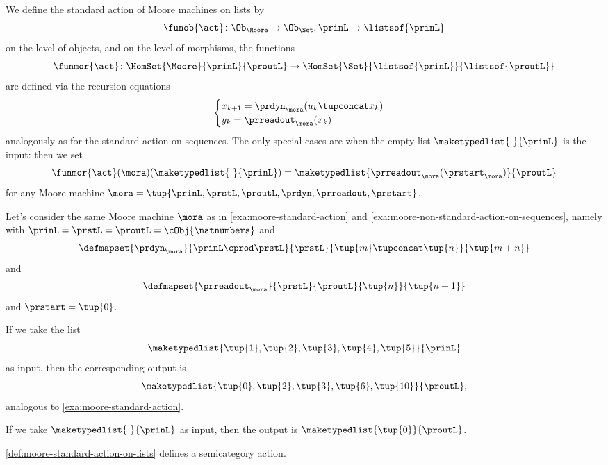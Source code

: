 \begin{definition}
\label{def:moore-standard-action-on-lists}
We define the standard action of Moore machines on lists by 
\begin{equation}
\funob{\act} \colon \Ob_{\Moore} \to \Ob_{\Set}, \prinL \mapsto \listsof{\prinL}
\end{equation}
on the level of objects, and on the level of morphisms, the functions 
\begin{equation}
\funmor{\act} \colon  \HomSet{\Moore}{\prinL}{\proutL} \to \HomSet{\Set}{ \listsof{\prinL}}{\listsof{\proutL}}
\end{equation}
are defined via the recursion equations
\begin{equation}
\label{eq:moore-recursion-once-again}
    \begin{cases}
        x_{k+1} = \prdyn_\mora(u_k \tupconcat x_k) \\
        y_{k}   = \prreadout_\mora(x_{k})
    \end{cases}
\end{equation}
analogously as for the standard action on sequences. The only special cases are when the empty list $\maketypedlist{\ }{\prinL}$ is the input: then we set 
$$
\funmor{\act}(\mora)(\maketypedlist{\ }{\prinL}) = \maketypedlist{ \prreadout_\mora(\prstart_\mora) }{\proutL}
$$
for any Moore machine $\mora = \tup{\prinL,\prstL,\proutL,\prdyn,\prreadout,\prstart}$.
\end{definition}

\begin{example}
\label{exa:moore-non-standard-action-on-lists}
Let's consider the same Moore machine $\mora$ as in \cref{exa:moore-standard-action} and \cref{exa:moore-non-standard-action-on-sequences}, namely with $\prinL = \prstL = \proutL = \cObj{\natnumbers}$
and 
\begin{equation}
\defmapset{
\prdyn_\mora
}{
\prinL \cprod \prstL
}{
\prstL
}{
\tup{m} \tupconcat \tup{n}
}{
\tup{m + n}
}
\end{equation}
and 
\begin{equation}
\defmapset{
\prreadout_\mora
}{
\prstL
}{
\proutL
}{
\tup{n}
}{
\tup{n+1}
}
\end{equation}
and $\prstart = \tup{0}$. 

If we take the list 
$$
\maketypedlist{\tup{1}, \tup{2}, \tup{3}, \tup{4}, \tup{5}}{\prinL}
$$
as input, then the corresponding output is 
$$
\maketypedlist{\tup{0}, \tup{2}, \tup{3}, \tup{6}, \tup{10}}{\proutL},
$$
analogous to \cref{exa:moore-standard-action}. 

If we take $\maketypedlist{\ }{\prinL}$ as input, then the output is $\maketypedlist{\tup{0}}{\proutL}$.
\end{example}



\begin{lemma}
\cref{def:moore-standard-action-on-lists} defines a semicategory action. 
\end{lemma}





